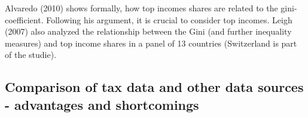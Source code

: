 \documentclass[twoside]{article}\usepackage[]{graphicx}\usepackage[]{color}
\begin{document}
\begin{multicols}{2}
Alvaredo (2010) shows formally, how top incomes shares are related to the gini-coefficient. Following his argument, it is crucial to consider top incomes. Leigh (2007) also analyzed the relationship between the Gini (and further inequality measures) and top income shares in a panel of 13 countries (Switzerland is part of the studie). 

\subsection{Comparison of tax data and other data sources - advantages and shortcomings}




\end{multicols}
\end{document}
